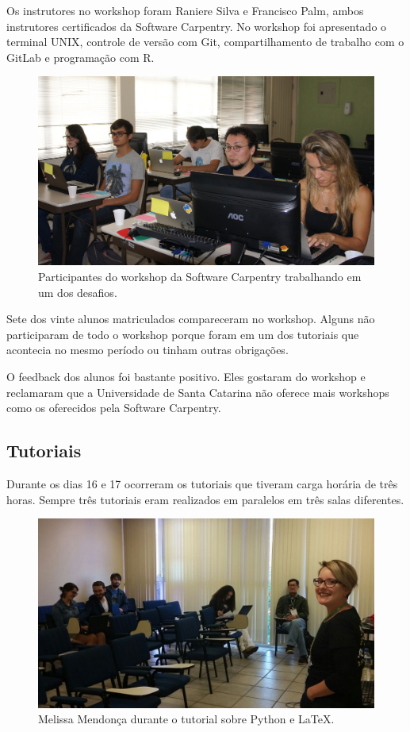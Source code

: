 \documentclass[12pt]{article}
\begin{document}
Os instrutores no workshop foram Raniere Silva e Francisco Palm,
ambos instrutores certificados da Software Carpentry.
No workshop foi apresentado o terminal UNIX, controle de versão com Git,
compartilhamento de trabalho com o GitLab e programação com R.

\begin{figure}[!htb]
\center
\includegraphics[height=.3\textheight]{swc-students.jpg}
\caption{Participantes do workshop da Software Carpentry trabalhando em um dos
desafios.}
\end{figure}

Sete dos vinte alunos matriculados compareceram no workshop.
Alguns não participaram de todo o workshop porque foram em um dos tutoriais que
acontecia no mesmo período ou tinham outras obrigações.

O feedback dos alunos foi bastante positivo. Eles gostaram do workshop
e reclamaram que a Universidade de Santa Catarina não oferece mais workshops
como os oferecidos pela Software Carpentry.

\subsection*{Tutoriais}

Durante os dias 16 e 17 ocorreram os tutoriais que tiveram carga horária de três
horas. Sempre três tutoriais eram realizados em paralelos em três salas
diferentes.

\begin{figure}[!htb]
\center
\includegraphics[height=.3\textheight]{tutorial-latex.jpg}
\caption{Melissa Mendonça durante o tutorial sobre Python e LaTeX.}
\end{figure}
\end{document}
